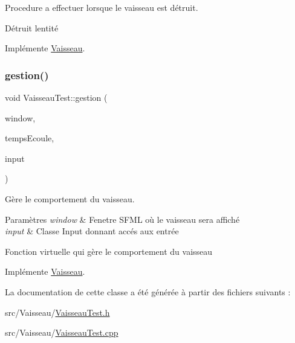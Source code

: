 Procedure a effectuer lorsque le vaisseau est détruit. 

Détruit l\textquotesingle{}entité 

Implémente \hyperlink{class_vaisseau_af4f490c5fd9e171b23067ec73aa737ad}{Vaisseau}.

\mbox{\label{class_vaisseau_test_a83da402707d73465178b4e654d2e054a}} 
\subsubsection{\texorpdfstring{gestion()}{gestion()}}
{\footnotesize\ttfamily void Vaisseau\+Test\+::gestion (\begin{DoxyParamCaption}\item[{sf\+::\+Render\+Window \&}]{window,  }\item[{sf\+::\+Time}]{temps\+Ecoule,  }\item[{\hyperlink{_input_8h_a5588d60d674991c719a8df848313e966}{Input} \&}]{input }\end{DoxyParamCaption})\hspace{0.3cm}{\ttfamily [virtual]}}



Gère le comportement du vaisseau. 


\begin{DoxyParams}{Paramètres}
{\em window} & Fenetre S\+F\+ML où le vaisseau sera affiché \\
\hline
{\em input} & Classe Input donnant accés aux entrée\\
\hline
\end{DoxyParams}
Fonction virtuelle qui gère le comportement du vaisseau 

Implémente \hyperlink{class_vaisseau_afaa179c1f03255d7869b8e2296ed8307}{Vaisseau}.



La documentation de cette classe a été générée à partir des fichiers suivants \+:\begin{DoxyCompactItemize}
\item 
src/\+Vaisseau/\hyperlink{_vaisseau_test_8h}{Vaisseau\+Test.\+h}\item 
src/\+Vaisseau/\hyperlink{_vaisseau_test_8cpp}{Vaisseau\+Test.\+cpp}\end{DoxyCompactItemize}
